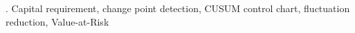 \documentclass[12pt]{article}
\begin{document}
.
Capital requirement, change point detection, CUSUM control chart, fluctuation reduction, Value-at-Risk


%
%
%
%
%
%
%
%
%
\end{document}
